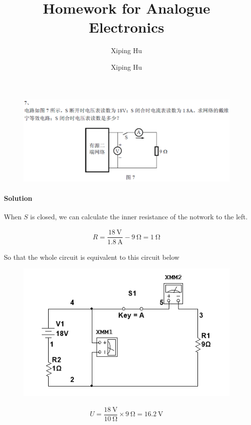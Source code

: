 \documentclass{article}
\author{Xiping Hu}
\author{Xiping Hu}
\affil{http://thehxp.tech/}
\title{Homework for Analogue Electronics}
\begin{document}
\maketitle

\begin{figure}[H]
  \centering
  \includegraphics[width=\linewidth]{figures/7}
  \label{fig:}
\end{figure}

\paragraph{Solution}

When $S$ is closed, we can calculate the inner resistance of the notwork to the left.

\begin{equation*}
  \begin{aligned}
    R = \dfrac{18 \  \mathrm{V}}{1.8 \  \mathrm{A}} - 9 \  \mathrm{\Omega} = 1 \  \mathrm{\Omega}
  \end{aligned}
\end{equation*}

So that the whole circuit is equivalent to this circuit below

\begin{figure}[H]
  \centering
  \includegraphics[width=0.5\linewidth]{figures/10}
  \label{fig:}
\end{figure}

\begin{equation*}
  \begin{aligned}
    U = \dfrac{18 \  \mathrm{V}}{10 \  \mathrm{\Omega}} \times 9 \  \mathrm{\Omega} = 16.2 \  \mathrm{V}
  \end{aligned}
\end{equation*}
\end{document}
